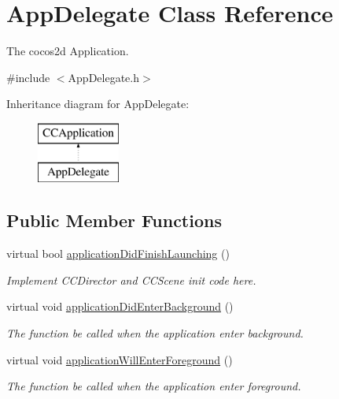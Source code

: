 \hypertarget{class_app_delegate}{\section{App\-Delegate Class Reference}
\label{class_app_delegate}
}


The cocos2d Application.  




{\ttfamily \#include $<$App\-Delegate.\-h$>$}

Inheritance diagram for App\-Delegate\-:\begin{figure}[H]
\begin{center}
\leavevmode
\includegraphics[height=2.000000cm]{class_app_delegate}
\end{center}
\end{figure}
\subsection*{Public Member Functions}
\begin{DoxyCompactItemize}
\item 
virtual bool \hyperlink{class_app_delegate_a68cbaed49edf7581dc59a09d5062fff3}{application\-Did\-Finish\-Launching} ()
\begin{DoxyCompactList}\small\item\em Implement C\-C\-Director and C\-C\-Scene init code here. \end{DoxyCompactList}\item 
virtual void \hyperlink{class_app_delegate_a17cb09777419781698324e0415bffd3a}{application\-Did\-Enter\-Background} ()
\begin{DoxyCompactList}\small\item\em The function be called when the application enter background. \end{DoxyCompactList}\item 
virtual void \hyperlink{class_app_delegate_ac4d653e3f74a91efef5f2def58fe3108}{application\-Will\-Enter\-Foreground} ()
\begin{DoxyCompactList}\small\item\em The function be called when the application enter foreground. \end{DoxyCompactList}\end{DoxyCompactItemize}


